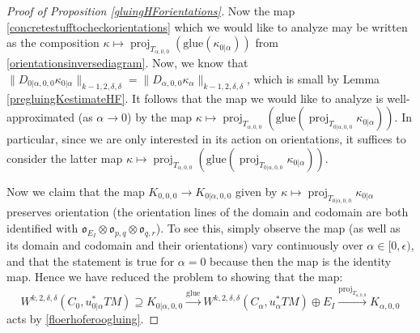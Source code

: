 \documentclass[12pt]{article}
\theoremstyle{definition}
\theoremstyle{remark}
\numberwithin{equation}{subsection}
\newcommand{\oo}{\mathfrak o}
\newcommand{\proj}{\operatorname{proj}}
\begin{document}
\begin{proof}[Proof of Proposition \ref{gluingHForientations}]
Now the map \eqref{concretestufftocheckorientations} which we would like to analyze may be written as the composition $\kappa\mapsto\proj_{T_{\alpha,0,0}}(\mathrm{glue}(\kappa_{0|\alpha}))$ from \eqref{orientationsinversediagram}.  Now, we know that $\|D_{0|\alpha,0,0}\kappa_{0|\alpha}\|_{k-1,2,\delta,\delta}=\|D_{\alpha,0,0}\kappa_\alpha\|_{k-1,2,\delta,\delta}$, which is small by Lemma \ref{pregluingKestimateHF}.  It follows that the map we would like to analyze is well-approximated (as $\alpha\to 0$) by the map $\kappa\mapsto\proj_{T_{\alpha,0,0}}(\mathrm{glue}(\proj_{T_{0|\alpha,0,0}}\kappa_{0|\alpha}))$.  In particular, since we are only interested in its action on orientations, it suffices to consider the latter map $\kappa\mapsto\proj_{T_{\alpha,0,0}}(\mathrm{glue}(\proj_{T_{0|\alpha,0,0}}\kappa_{0|\alpha}))$.

Now we claim that the map $K_{0,0,0}\to K_{0|\alpha,0,0}$ given by $\kappa\mapsto\proj_{T_{0|\alpha,0,0}}\kappa_{0|\alpha}$ preserves orientation (the orientation lines of the domain and codomain are both identified with $\oo_{E_I}\otimes\oo_{p,q}\otimes\oo_{q,r}$).  To see this, simply observe the map (as well as its domain and codomain and their orientations) vary continuously over $\alpha\in[0,\epsilon)$, and that the statement is true for $\alpha=0$ because then the map is the identity map.  Hence we have reduced the problem to showing that the map:
\begin{equation}\label{reducedmaporientations}
W^{k,2,\delta,\delta}(C_0,u_{0|\alpha}^\ast TM)\supseteq K_{0|\alpha,0,0}\xrightarrow{\mathrm{glue}}W^{k,2,\delta,\delta}(C_\alpha,u_\alpha^\ast TM)\oplus E_I\xrightarrow{\proj_{T_{\alpha,0,0}}}K_{\alpha,0,0}
\end{equation}
acts by \eqref{floerhoferoogluing}.


\end{proof}
\end{document}
